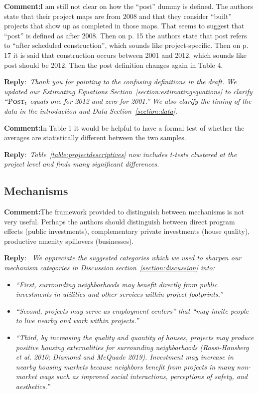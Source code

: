 \documentclass{article}
\newcounter{reviewer}
\newcounter{point}[reviewer]
\newcommand{\reply}{\medskip \noindent \textbf{Reply}:\ \textit }
\newcommand{\sr}{\begin{minipage}{\dimexpr\textwidth-3cm}}
\newcommand{\er}{\end{minipage}}
\newcommand{\cc}{\medskip \noindent \textbf{Comment:}\hspace{2em}}
\begin{document}
\cc I am still not clear on how the “post” dummy is defined. The authors state that their project maps are from 2008 and that they consider “built” projects that show up as completed in those maps. That seems to suggest that “post” is defined as after 2008. Then on p. 15 the authors state that post refers to “after scheduled construction”, which sounds like project-specific. Then on p. 17 it is said that construction occurs between 2001 and 2012, which sounds like post should be 2012. Then the post definition changes again in Table 4.

\sr
\reply{Thank you for pointing to the confusing definitions in the draft.  We updated our Estimating Equations Section~\ref{section:estimatingequations} to clarify ``$\textsc{Post}_{t}$ equals one for 2012 and zero for 2001.''  We also clarify the timing of the data in the introduction and Data Section~\ref{section:data}.}\\
\er 

\cc In Table 1 it would be helpful to have a formal test of whether the averages are statistically different between the two samples.

\sr
\reply{Table~\ref{table:projectdescriptives} now includes t-tests clustered at the project level and finds many significant differences.}\\
\er

\subsection{Mechanisms}

\cc The framework provided to distinguish between mechanisms is not very useful. Perhaps the authors should distinguish between direct program effects (public investments), complementary private investments (house quality), productive amenity spillovers (businesses).

\sr
\reply{ We appreciate the suggested categories which we used to sharpen our mechanism categories in Discussion section~\ref{section:discussion} into:  }
\begin{itemize}
    \item \textit{``First, surrounding neighborhoods may benefit directly from public investments in utilities and other services within project footprints.''}
    \item \textit{``Second, projects may serve as employment centers'' that ``may invite people to live nearby and work within projects.''}
    \item \textit{``Third, by increasing the quality and quantity of houses, projects may produce positive housing externalities for surrounding neighborhoods (Rossi-Hansberg et al. 2010; Diamond and McQuade 2019).  Investment may increase in nearby housing markets because neighbors benefit from projects in many non-market ways such as improved social interactions, perceptions of safety, and aesthetics.''}
\end{itemize}
\er\\
\end{document}
